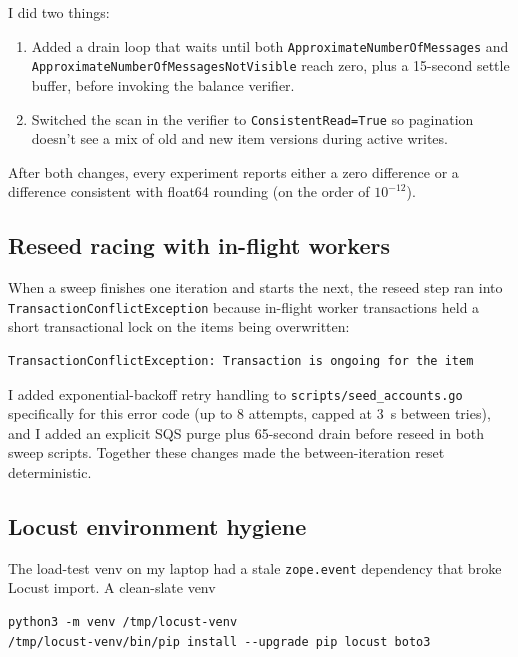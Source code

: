 \documentclass[11pt,a4paper]{article}
\begin{document}
I did two things:
\begin{enumerate}[leftmargin=*, itemsep=0.2em]
    \item Added a drain loop that waits until both \texttt{ApproximateNumberOfMessages} and \texttt{ApproximateNumberOfMessagesNotVisible} reach zero, plus a 15-second settle buffer, before invoking the balance verifier.
    \item Switched the scan in the verifier to \texttt{ConsistentRead=True} so pagination doesn't see a mix of old and new item versions during active writes.
\end{enumerate}

After both changes, every experiment reports either a zero difference or a difference consistent with float64 rounding (on the order of $10^{-12}$).

\subsection{Reseed racing with in-flight workers}

When a sweep finishes one iteration and starts the next, the reseed step ran into \texttt{TransactionConflictException} because in-flight worker transactions held a short transactional lock on the items being overwritten:

\begin{lstlisting}
TransactionConflictException: Transaction is ongoing for the item
\end{lstlisting}

I added exponential-backoff retry handling to \texttt{scripts/seed\_accounts.go} specifically for this error code (up to 8 attempts, capped at 3~s between tries), and I added an explicit SQS purge plus 65-second drain before reseed in both sweep scripts. Together these changes made the between-iteration reset deterministic.

\subsection{Locust environment hygiene}

The load-test venv on my laptop had a stale \texttt{zope.event} dependency that broke Locust import. A clean-slate venv

\begin{lstlisting}
python3 -m venv /tmp/locust-venv
/tmp/locust-venv/bin/pip install --upgrade pip locust boto3
\end{lstlisting}
\end{document}
